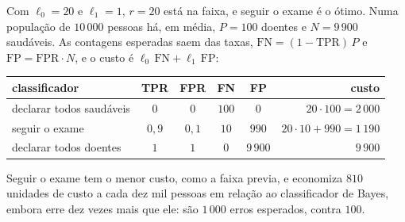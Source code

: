 \begin{solucao}
Com $\ell_0=20$ e $\ell_1=1$, $r=20$ está na faixa, e seguir o exame é o ótimo. Numa população
de $10\,000$ pessoas há, em média, $P=100$ doentes e $N=9\,900$ saudáveis. As contagens
esperadas saem das taxas, $\mathrm{FN}=(1-\mathrm{TPR})\,P$ e $\mathrm{FP}=\mathrm{FPR}\cdot N$,
e o custo é $\ell_0\,\mathrm{FN}+\ell_1\,\mathrm{FP}$:
\begin{center}\small
\renewcommand{\arraystretch}{1.25}
\begin{tabular}{@{}lccccr@{}}
\toprule
classificador & TPR & FPR & FN & FP & custo \\
\midrule
declarar todos saudáveis & $0$ & $0$ & $100$ & $0$ & $20\cdot100=2\,000$ \\
seguir o exame & $0{,}9$ & $0{,}1$ & $10$ & $990$ & $20\cdot10+990=1\,190$ \\
declarar todos doentes & $1$ & $1$ & $0$ & $9\,900$ & $9\,900$ \\
\bottomrule
\end{tabular}
\end{center}
Seguir o exame tem o menor custo, como a faixa previa, e economiza $810$ unidades de custo a
cada dez mil pessoas em relação ao classificador de Bayes, embora erre dez vezes mais que ele:
são $1\,000$ erros esperados, contra $100$.
\end{solucao}

